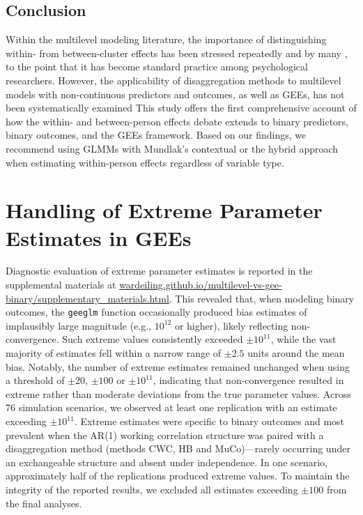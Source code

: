 \documentclass[stu]{apa7}
\begin{document}
\subsection{Conclusion}

Within the multilevel modeling literature, the importance of distinguishing within- from between-cluster effects has been stressed repeatedly and by many \parencite[e.g.,][]{enders_centering_2007, kreft_effect_1995, raudenbush_hierarchical_2002}, to the point that it has become standard practice among psychological researchers. However, the applicability of disaggregation methods to multilevel models with non-continuous predictors and outcomes, as well as GEEs, has not been systematically examined This study offers the first comprehensive account of how the within- and between-person effects debate extends to binary predictors, binary outcomes, and the GEEs framework. Based on our findings, we recommend using GLMMs with Mundlak’s contextual or the hybrid approach when estimating within-person effects regardless of variable type.

\printbibliography

\newpage
\appendix
\section{Handling of Extreme Parameter Estimates in GEEs}
\label{app:extremeGEEvalues}

Diagnostic evaluation of extreme parameter estimates is reported in the supplemental materials at \href{https://wardeiling.github.io/multilevel-vs-gee-binary/supplementary_materials.html}{wardeiling.github.io/multilevel-vs-gee-binary/supplementary\_materials.html}. This revealed that, when modeling binary outcomes, the \texttt{geeglm} function \parencite{halekoh_r_2006} occasionally produced bias estimates of implausibly large magnitude (e.g., $10^{12}$ or higher), likely reflecting non-convergence. Such extreme values consistently exceeded $\pm 10^{11}$, while the vast majority of estimates fell within a narrow range of $\pm 2.5$ units around the mean bias. Notably, the number of extreme estimates remained unchanged when using a threshold of $\pm 20$, $\pm 100$ or $\pm 10^{11}$, indicating that non-convergence resulted in extreme rather than moderate deviations from the true parameter values. Across 76 simulation scenarios, we observed at least one replication with an estimate exceeding $\pm 10^{11}$. Extreme estimates were specific to binary outcomes and most prevalent when the AR(1) working correlation structure was paired with a disaggregation method (methods CWC, HB and MuCo)—rarely occurring under an exchangeable structure and absent under independence. In one scenario, approximately half of the replications produced extreme values. To maintain the integrity of the reported results, we excluded all estimates exceeding $\pm 100$ from the final analyses. 
\end{document}
